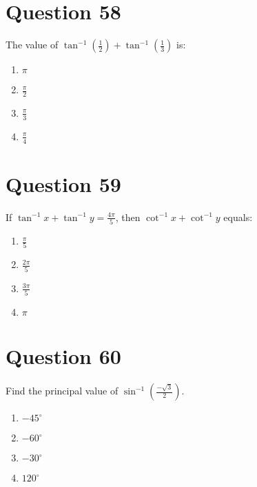 \documentclass{article}
\begin{document}
\section*{Question 58}
The value of \(\tan ^{-1}\left(\frac{1}{2}\right)+\tan ^{-1}\left(\frac{1}{3}\right)\) is:
\begin{enumerate}[label=(\alph*)]
\item \(\pi\)
\item \(\frac{\pi}{2}\)
\item \(\frac{\pi}{3}\)
\item \(\frac{\pi}{4}\)
\end{enumerate}
\newpage
\section*{Question 59}
If \(\tan ^{-1} x+\tan ^{-1} y=\frac{4 \pi}{5}\), then \(\cot ^{-1} x+\cot ^{-1} y\) equals:
\begin{enumerate}[label=(\alph*)]
\item \(\frac{\pi}{5}\)
\item \(\frac{2 \pi}{5}\)
\item \(\frac{3 \pi}{5}\)
\item \(\pi\)
\end{enumerate}
\newpage
\section*{Question 60}
Find the principal value of \(\sin ^{-1}\left(\frac{-\sqrt{3}}{2}\right)\).
\begin{enumerate}[label=(\alph*)]
\item \(-45^{\circ}\)
\item \(-60^{\circ}\)
\item \(-30^{\circ}\)
\item \(120^{\circ}\)
\end{enumerate}
\newpage
\end{document}
